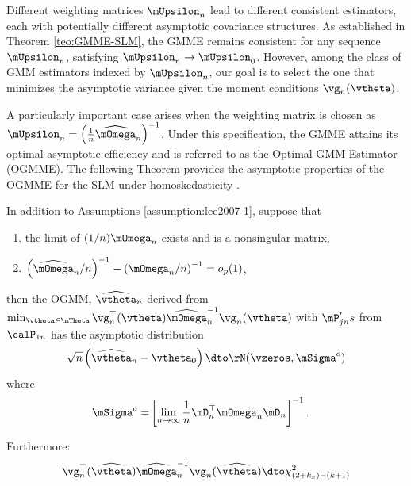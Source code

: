 Different weighting matrices $\mUpsilon_n$ lead to different consistent estimators, each with potentially different asymptotic covariance structures. As established in Theorem \ref{teo:GMME-SLM}, the GMME remains consistent for any sequence $\mUpsilon_n$, satisfying $\mUpsilon_n \to \mUpsilon_0$. However, among the class of GMM estimators indexed by $\mUpsilon_n$, our goal is to select the one that minimizes the asymptotic variance given the moment conditions $\vg_n(\vtheta)$. 

A particularly important case arises when the weighting matrix is chosen as $\mUpsilon_n = \left(\frac{1}{n}\widehat{\mOmega}_n\right)^{-1}$. Under this specification, the GMME attains its optimal asymptotic efficiency and is referred to as the Optimal GMM Estimator (OGMME). The following Theorem provides the asymptotic properties of the OGMME for the SLM under homoskedasticity \citep{lee2007gmm}.

\begin{theorem}
In addition to  Assumptions \ref{assumption:lee2007-1}, suppose that 
\begin{enumerate}
  \item the limit of $(1/n)\mOmega_n$ exists and is a nonsingular matrix, 
  \item $\left(\widehat{\mOmega}_n / n\right)^{-1} -\left(\mOmega_n / n\right)^{-1} = o_p(1)$, 
\end{enumerate}
%
then the OGMM, $\widehat{\vtheta}_{n}$ derived from $\min_{\vtheta \in \mTheta}\vg_n^\top(\vtheta)\widehat{\mOmega}_n^{-1}\vg_n(\vtheta)$ with $\mP_{jn}'s$ from $\calP_{1n}$ has the asymptotic distribution
\begin{equation*}
\sqrt{n}\left(\widehat{\vtheta}_n - \vtheta_0\right) \dto \rN(\vzeros, \mSigma^o)
\end{equation*}
%
where
\begin{equation*}
\begin{aligned}
  \mSigma^o = &  \left[\lim_{n\to\infty}\frac{1}{n}\mD_n^\top\mOmega_n\mD_n\right]^{-1}.
  \end{aligned}
\end{equation*}

Furthermore:
\begin{equation*}
\vg_n^\top(\widehat{\vtheta})\widehat{\mOmega}_n^{-1}\vg_n(\widehat{\vtheta}) \dto \chi^2_{(2 + k_x)- (k + 1)}
\end{equation*}
\end{theorem}



